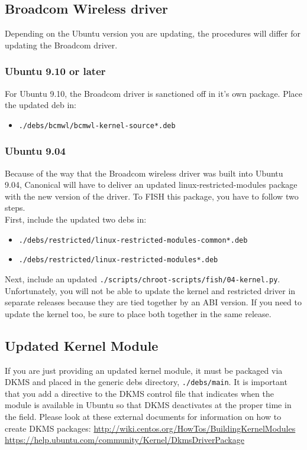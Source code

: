 \documentclass[letterpaper,10pt,titlepage]{article}
\begin{document}
\subsection{Broadcom Wireless driver}
Depending on the Ubuntu version you are updating, the procedures will differ for updating the Broadcom driver.

\subsubsection{Ubuntu 9.10 or later}
For Ubuntu 9.10, the Broadcom driver is sanctioned off in it's own package.  Place the updated deb in:
\begin{itemize}
\item \texttt{./debs/bcmwl/bcmwl-kernel-source*.deb}
\end{itemize}

\subsubsection{Ubuntu 9.04}
Because of the way that the Broadcom wireless driver was built into Ubuntu 9.04, Canonical will have to deliver an updated linux-restricted-modules package with the new version of the driver.  To FISH this package, you have to follow two steps.
\\
First, include the updated two debs in:
\begin{itemize}
\item \texttt{./debs/restricted/linux-restricted-modules-common*.deb}
\item \texttt{./debs/restricted/linux-restricted-modules*.deb}
\end{itemize}
Next, include an updated \texttt{./scripts/chroot-scripts/fish/04-kernel.py}.  Unfortunately, you will not be able to update the kernel and restricted driver in separate releases because they are tied together by an ABI version.  If you need to update the kernel too, be sure to place both together in the same release.

\subsection{Updated Kernel Module}
\label{kernel}
If you are just providing an updated kernel module, it must be packaged via DKMS and placed in the generic debs directory, \texttt{./debs/main}.  It is important that you add a directive to the DKMS control file that indicates when the module is available in Ubuntu so that DKMS deactivates at the proper time in the field.
Please look at these external documents for information on how to create DKMS packages:
\linebreak 
\url{http://wiki.centos.org/HowTos/BuildingKernelModules}
\linebreak
\url{https://help.ubuntu.com/community/Kernel/DkmsDriverPackage}
\end{document}
